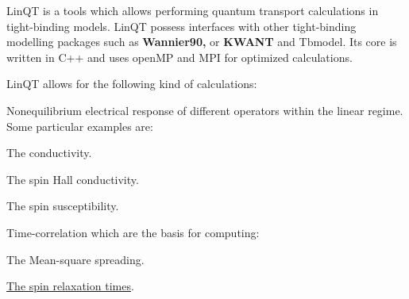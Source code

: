 Lin\+QT is a tools which allows performing quantum transport calculations in tight-\/binding models. Lin\+QT possess interfaces with other tight-\/binding modelling packages such as {\bfseries Wannier90,} or {\bfseries K\+W\+A\+NT} and Tbmodel. Its core is written in C++ and uses open\+MP and M\+PI for optimized calculations.

Lin\+QT allows for the following kind of calculations\+:


\begin{DoxyEnumerate}
\item Nonequilibrium electrical response of different operators within the linear regime. Some particular examples are\+:
\begin{DoxyEnumerate}
\item The conductivity.
\item The spin Hall conductivity.
\item The spin susceptibility.
\end{DoxyEnumerate}
\item Time-\/correlation which are the basis for computing\+:
\begin{DoxyEnumerate}
\item The Mean-\/square spreading.
\item \hyperlink{spinrelaxation}{The spin relaxation times}. 
\end{DoxyEnumerate}
\end{DoxyEnumerate}